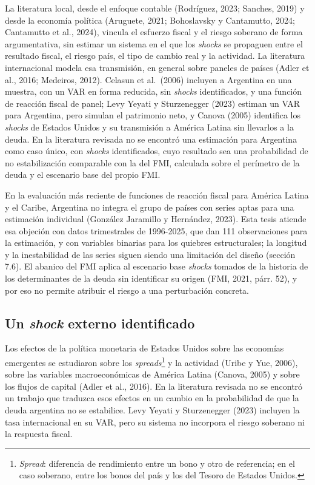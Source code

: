 La literatura local, desde el enfoque contable (Rodríguez, 2023;
Sanches, 2019) y desde la economía política (Aruguete, 2021; Bohoslavsky
y Cantamutto, 2024; Cantamutto et al., 2024), vincula el esfuerzo fiscal
y el riesgo soberano de forma argumentativa, sin estimar un sistema en
el que los \emph{shocks} se propaguen entre el resultado fiscal, el
riesgo país, el tipo de cambio real y la actividad. La literatura
internacional modela esa transmisión, en general sobre paneles de países
(Adler et al., 2016; Medeiros, 2012). Celasun et al.~(2006) incluyen a
Argentina en una muestra, con un VAR en forma reducida, sin
\emph{shocks} identificados, y una función de reacción fiscal de panel;
Levy Yeyati y Sturzenegger (2023) estiman un VAR para Argentina, pero
simulan el patrimonio neto, y Canova (2005) identifica los \emph{shocks}
de Estados Unidos y su transmisión a América Latina sin llevarlos a la
deuda. En la literatura revisada no se encontró una estimación para
Argentina como caso único, con \emph{shocks} identificados, cuyo
resultado sea una probabilidad de no estabilización comparable con la
del FMI, calculada sobre el perímetro de la deuda y el escenario base
del propio FMI.

En la evaluación más reciente de funciones de reacción fiscal para
América Latina y el Caribe, Argentina no integra el grupo de países con
series aptas para una estimación individual (González Jaramillo y
Hernández, 2023). Esta tesis atiende esa objeción con datos trimestrales
de 1996-2025, que dan 111 observaciones para la estimación, y con
variables binarias para los quiebres estructurales; la longitud y la
inestabilidad de las series siguen siendo una limitación del diseño
(sección 7.6). El abanico del FMI aplica al escenario base \emph{shocks}
tomados de la historia de los determinantes de la deuda sin identificar
su origen (FMI, 2021, párr. 52), y por eso no permite atribuir el riesgo
a una perturbación concreta.

\subsection{\texorpdfstring{Un \emph{shock} externo
identificado}{Un shock externo identificado}}

Los efectos de la política monetaria de Estados Unidos sobre las
economías emergentes se estudiaron sobre los \emph{spreads}\footnote{\emph{Spread}:
  diferencia de rendimiento entre un bono y otro de referencia; en el
  caso soberano, entre los bonos del país y los del Tesoro de Estados
  Unidos.} y la actividad (Uribe y Yue, 2006), sobre las variables
macroeconómicas de América Latina (Canova, 2005) y sobre los flujos de
capital (Adler et al., 2016). En la literatura revisada no se encontró
un trabajo que traduzca esos efectos en un cambio en la probabilidad de
que la deuda argentina no se estabilice. Levy Yeyati y Sturzenegger
(2023) incluyen la tasa internacional en su VAR, pero su sistema no
incorpora el riesgo soberano ni la respuesta fiscal.

